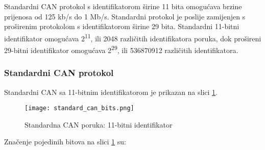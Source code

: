 Standardni CAN protokol s identifikatorom širine 11 bita omogućava brzine prijenosa od 125 kb/s do 1 Mb/s. Standardni protokol je poslije zamijenjen s proširenim protokolom s identifikatorom širine 29 bita. Standardni 11-bitni identifikator omogućava 2\textsuperscript{11}, ili 2048 različitih identifikatora poruka, dok prošireni 29-bitni identifikator omogućava 2\textsuperscript{29}, ili 536870912 različitih identifikatora. 

\subsubsection{Standardni CAN protokol}

Standardni CAN sa 11-bitnim identifikatorom je prikazan na slici \ref{fig:standard_can_bits}.
\begin{figure}[H]
	\centering
	\texttt{[image: standard\_can\_bits.png]}
	\caption{Standardna CAN poruka: 11-bitni identifikator \cite[str. 3]{can_manual}}
	\label{fig:standard_can_bits}
\end{figure}
Značenje pojedinih bitova na slici \ref{fig:standard_can_bits} su:
